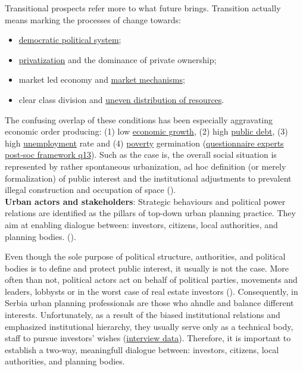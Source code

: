 \documentclass[11pt]{report}
\begin{document}
\begin{itemize}
Transitional prospects refer more to what future brings. Transition actually means marking the processes of change towards:

\begin{itemize}
\item \underline{democratic political system};
\item \underline{privatization} and the dominance of private ownership;
\item market led economy and \underline{market mechanisms};
\item clear class division and \underline{uneven distribution of resources}.
\end{itemize}

The confusing overlap of these conditions has been especially aggravating economic order producing:
(1) low \underline{economic growth},
(2) high \underline{public debt},
(3) high \underline{unemployment} rate
and
(4) \underline{poverty} germination (\href{}{questionnaire experts post-soc framework q13}).
Such as the case is, the overall social situation is represented by rather spontaneous urbanization, ad hoc definition (or merely formalization) of public interest and the institutional adjustments to prevalent illegal construction and occupation of space (\cite{Urbani razvoj u Srbiji Ministry of Space 2014}).
\\

\textbf{Urban actors and stakeholders}:
Strategic behaviours and political power relations are identified as the pillars of top-down urban planning practice.
They aim at enabling dialogue between: investors, citizens, local authorities, and planning bodies.
(\cite{Vujosevic 2004 Belgrade Metropolitan Area Governance}).

Even though the sole purpose of political structure, authorities, and political bodies is to define and protect public interest, it usually is not the case.
More often than not, political actors act on behalf of political parties, movements and leaders, lobbysts or in the worst case of real estate investors (\cite{Urbani razvoj u Srbiji Ministry of Space 2014}).
Consequently, in Serbia urban planning professionals are those who ahndle and balance different interests. Unfortunately, as a result of the biased institutional relations and emphasized institutional hierarchy, they usually serve only as a technical body, staff to pursue investors' wishes (\href{}{interview data}).
Therefore, it is important to establish a two-way, meaningfull dialogue between: investors, citizens, local authorities, and planning bodies.


\end{itemize}
\end{document}
